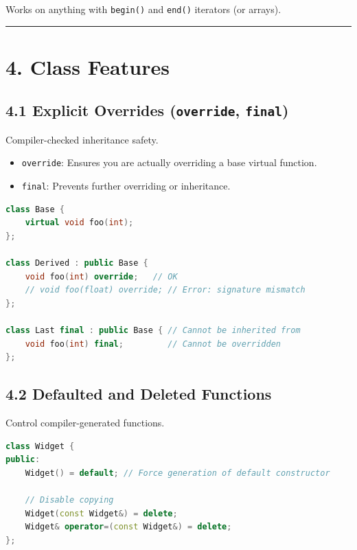 Works on anything with \passthrough{\lstinline!begin()!} and
\passthrough{\lstinline!end()!} iterators (or arrays).

\begin{center}\rule{0.5\linewidth}{0.5pt}\end{center}

\hypertarget{class-features}{%
\section{4. Class Features}\label{class-features}}

\hypertarget{explicit-overrides-override-final}{%
\subsection{\texorpdfstring{4.1 Explicit Overrides (\texttt{override},
\texttt{final})}{4.1 Explicit Overrides (override, final)}}\label{explicit-overrides-override-final}}

Compiler-checked inheritance safety.

\begin{itemize}
\tightlist
\item
  \passthrough{\lstinline!override!}: Ensures you are actually
  overriding a base virtual function.
\item
  \passthrough{\lstinline!final!}: Prevents further overriding or
  inheritance.
\end{itemize}

\begin{lstlisting}[language={C++}]
class Base {
    virtual void foo(int);
};

class Derived : public Base {
    void foo(int) override;   // OK
    // void foo(float) override; // Error: signature mismatch
};

class Last final : public Base { // Cannot be inherited from
    void foo(int) final;         // Cannot be overridden
};
\end{lstlisting}

\hypertarget{defaulted-and-deleted-functions}{%
\subsection{4.2 Defaulted and Deleted
Functions}\label{defaulted-and-deleted-functions}}

Control compiler-generated functions.

\begin{lstlisting}[language={C++}]
class Widget {
public:
    Widget() = default; // Force generation of default constructor
    
    // Disable copying
    Widget(const Widget&) = delete;
    Widget& operator=(const Widget&) = delete;
};
\end{lstlisting}

